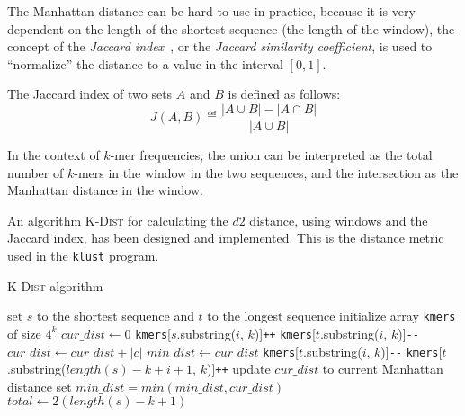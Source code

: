 The Manhattan distance can be hard to use in practice, because it is very
dependent on the length of the shortest sequence (the length of the window),
the concept of the \emph{Jaccard index}~\cite{jaccard1901,jaccard1912}, or the
\emph{Jaccard similarity coefficient}, is used to ``normalize'' the distance to
a value in the interval $[0,1]$.

The Jaccard index of two sets $A$ and $B$ is defined as follows:
\begin{equation}
  J(A, B) \eqdef \frac{|A \cup B| - |A \cap B|}{|A \cup B|}
\end{equation}

In the context of $k$-mer frequencies, the union can be interpreted as the
total number of $k$-mers in the window in the two sequences, and the
intersection as the Manhattan distance in the window.

An algorithm \textsc{K-Dist} for calculating the $d2$ distance, using windows
and the Jaccard index, has been designed and implemented. This is the distance
metric used in the \texttt{klust} program.

\begin{algorithm}
  \caption{\textsc{K-Dist} algorithm}
  \label{alg:K-Dist}
  \begin{algorithmic}[1]
    \Statex
      \State set $s$ to the shortest sequence and $t$ to the longest sequence
      \State initialize array \texttt{kmers} of size $4^k$
      \State $cur\_dist \gets 0$
        \State \texttt{kmers}[$s$.substring($i$, $k$)]\texttt{++}
        \State \texttt{kmers}[$t$.substring($i$, $k$)]\texttt{-{}-}
      \EndFor
        \State $cur\_dist \gets cur\_dist + |c|$ 
      \EndFor
      \State $min\_dist \gets cur\_dist$
       
        \State \texttt{kmers}[$t$.substring($i$, $k$)]\texttt{-{}-}
        \State \texttt{kmers}[$t$.substring($length(s)-k+i+1$, $k$)]\texttt{++}
        \State update $cur\_dist$ to current Manhattan distance
        \State set $min\_dist=min(min\_dist, cur\_dist)$
      \EndFor
          \State $total \gets 2(length(s)-k+1)$ 
      \State {} 
    \EndFunction
  \end{algorithmic}
\end{algorithm}



